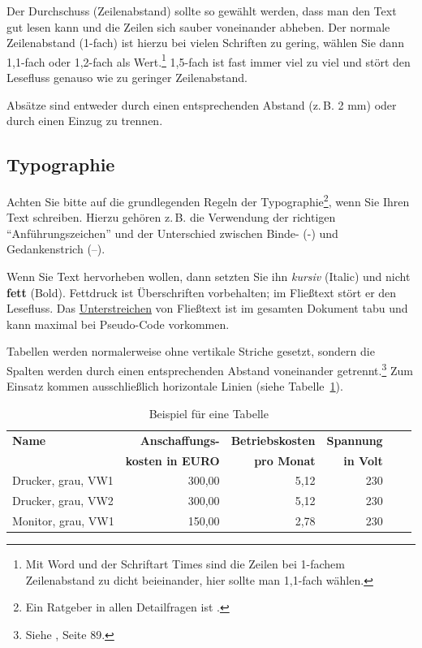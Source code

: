 \documentclass[a4paper,11pt,headings=normal]{scrartcl}
\begin{document}
Der Durchschuss (Zeilenabstand) sollte so gewählt werden, dass man den Text gut lesen kann und die Zeilen sich sauber voneinander abheben. Der normale Zeilenabstand (1-fach) ist hierzu bei vielen Schriften zu gering, wählen Sie dann 1,1-fach oder 1,2-fach als Wert.\footnote{Mit Word und der Schriftart Times sind die Zeilen bei 1-fachem Zeilenabstand zu dicht beieinander, hier sollte man 1,1-fach wählen.} 1,5-fach ist fast immer viel zu viel und stört den Lesefluss genauso wie zu geringer Zeilenabstand.

Absätze sind entweder durch einen entsprechenden Abstand (z.\,B. 2 mm) oder durch einen Einzug zu trennen.

\subsection{Typographie}
Achten Sie bitte auf die grundlegenden Regeln der Typographie\footnote{Ein Ratgeber in allen Detailfragen ist \cite{Forssman2002}.}, wenn Sie Ihren Text schreiben. Hierzu gehören z.\,B. die Verwendung der richtigen "`Anführungszeichen"' und der Unterschied zwischen Binde- (-) und Gedankenstrich (--).

Wenn Sie Text hervorheben wollen, dann setzten Sie ihn \textit{kursiv} (Italic) und nicht \textbf{fett} (Bold). Fettdruck ist Überschriften vorbehalten; im Fließtext stört er den Lesefluss. Das \underline{Unterstreichen} von Fließtext ist im gesamten Dokument tabu und kann maximal bei Pseudo-Code vorkommen.

Tabellen werden normalerweise ohne vertikale Striche gesetzt, sondern die Spalten werden durch einen entsprechenden Abstand voneinander getrennt.\footnote{Siehe \cite{Willberg1999}, Seite 89.} Zum Einsatz kommen ausschließlich horizontale Linien (siehe Tabelle~\ref{tabellenbeispiel}).

\begin{table}
\centering
\begin{tabular}{l r r r r r}
\toprule
\textbf{Name} & \textbf{Anschaffungs-} & \textbf{Betriebskosten} & \textbf{Spannung}  \\
& \textbf{kosten in EURO} & \textbf{pro Monat} & \textbf{in Volt} \\
\midrule
Drucker, grau, VW1 &    300,00 &   5,12 & 230  \\
Drucker, grau, VW2 &    300,00 &   5,12 & 230  \\
Monitor, grau, VW1 &    150,00 &   2,78 & 230  \\
\bottomrule
\end{tabular}
\caption{Beispiel für eine Tabelle}
\label{tabellenbeispiel}
\end{table}
\end{document}
